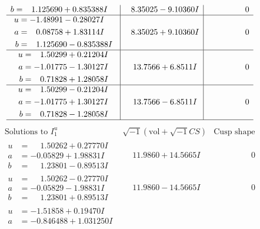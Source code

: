 \documentclass[1p]{elsarticle_modified}
\theoremstyle{definition}
\newcommand{\I}{\sqrt{-1}}
\begin{document}
$$\begin{array}{c|c|c}
\begin{aligned}
b &= \phantom{-}1.125690 + 0.835388 I\end{aligned}
 & \phantom{-}8.35025 - 9.10360 I & \phantom{-0.000000 } 0 \\ \hline\begin{aligned}
u &= -1.48991 - 0.28027 I \\
a &= \phantom{-}0.08758 + 1.83114 I \\
b &= \phantom{-}1.125690 - 0.835388 I\end{aligned}
 & \phantom{-}8.35025 + 9.10360 I & \phantom{-0.000000 } 0 \\ \hline\begin{aligned}
u &= \phantom{-}1.50299 + 0.21204 I \\
a &= -1.01775 - 1.30127 I \\
b &= \phantom{-}0.71828 + 1.28058 I\end{aligned}
 & \phantom{-}13.7566 + 6.8511 I & \phantom{-0.000000 } 0 \\ \hline\begin{aligned}
u &= \phantom{-}1.50299 - 0.21204 I \\
a &= -1.01775 + 1.30127 I \\
b &= \phantom{-}0.71828 - 1.28058 I\end{aligned}
 & \phantom{-}13.7566 - 6.8511 I & \phantom{-0.000000 } 0\\
 \hline 
 \end{array}$$\newpage$$\begin{array}{c|c|c}  
\text{Solutions to }I^u_{1}& \I (\text{vol} + \sqrt{-1}CS) & \text{Cusp shape}\\
 \hline 
\begin{aligned}
u &= \phantom{-}1.50262 + 0.27770 I \\
a &= -0.05829 + 1.98831 I \\
b &= \phantom{-}1.23801 - 0.89513 I\end{aligned}
 & \phantom{-}11.9860 + 14.5665 I & \phantom{-0.000000 } 0 \\ \hline\begin{aligned}
u &= \phantom{-}1.50262 - 0.27770 I \\
a &= -0.05829 - 1.98831 I \\
b &= \phantom{-}1.23801 + 0.89513 I\end{aligned}
 & \phantom{-}11.9860 - 14.5665 I & \phantom{-0.000000 } 0 \\ \hline\begin{aligned}
u &= -1.51858 + 0.19470 I \\
a &= -0.846488 + 1.031250 I \\

\end{aligned}
\end{array}$$
\end{document}
